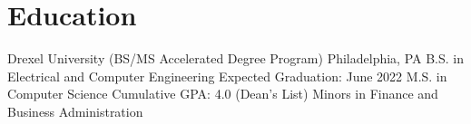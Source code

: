 \section{Education}

\education
  {Drexel University (BS/MS Accelerated Degree Program)}
  {Philadelphia, PA}
  {B.S. in Electrical and Computer Engineering}
  {Expected Graduation: June 2022}
  {M.S. in Computer Science}
  {Cumulative GPA: 4.0 (Dean's List)}
  {Minors in Finance and Business Administration}